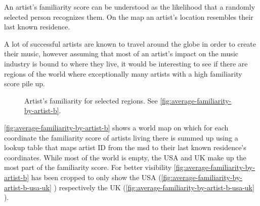 \documentclass[                                                             %
        12pt,                                                                   %
        twoside                                                                 %
    ]{scrartcl}                                                                 %
\begin{document}
An artist's familiarity score can be understood 
as the likelihood that a randomly selected person recognizes them. 
On the map an artist's location resembles their last known residence.

A lot of successful artists are known to travel around the globe 
in order to create their music, however assuming 
that most of an artist's impact on the music industry 
is bound to where they live, 
it would be interesting to see if there are regions of the world 
where exceptionally many artists with a high familiarity score pile up.

\begin{figure}
    \centering
    \caption[Artist's familiarity for selected regions.]{%
        Artist's familiarity for selected regions.
        See \autoref{fig:average-familiarity-by-artist-b}.
    }
    \label{fig:average-familiarity-by-artist-b-usa-uk}
    \hfill
\end{figure}

\autoref{fig:average-familiarity-by-artist-b} shows a world map on which 
for each coordinate the familiarity score of artists living there is
summed up using a lookup table that maps artist ID from the \gls{msd}
to their last known residence's coordinates.
While most of the world is empty, 
the USA and UK make up the most part of the familiarity score.
For better visibility \autoref{fig:average-familiarity-by-artist-b} has been cropped
to only show the USA (\autoref{fig:average-familiarity-by-artist-b-usa-uk}%
) 
respectively the UK (\autoref{fig:average-familiarity-by-artist-b-usa-uk}%
).
\end{document}
